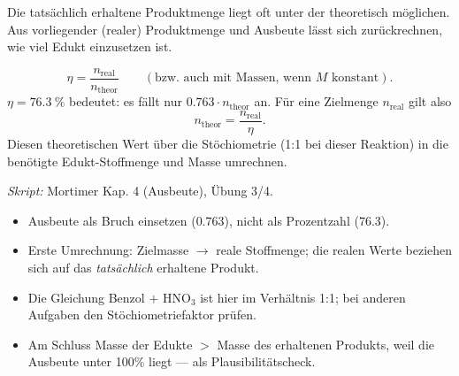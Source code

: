 

Die tatsächlich erhaltene Produktmenge liegt oft unter der theoretisch
möglichen. Aus vorliegender (realer) Produktmenge und Ausbeute lässt sich
zurückrechnen, wie viel Edukt einzusetzen ist.

\begin{werkzeugkasten}[Ausbeute]
\begin{equation}
  \eta = \frac{n_{\text{real}}}{n_{\text{theor}}}
  \qquad(\text{bzw.\ auch mit Massen, wenn } M \text{ konstant}).
\end{equation}
$\eta = \qty{76.3}{\percent}$ bedeutet: es fällt nur
$0.763\cdot n_{\text{theor}}$ an. Für eine Zielmenge
$n_{\text{real}}$ gilt also
\begin{equation}
  n_{\text{theor}} = \frac{n_{\text{real}}}{\eta}.
\end{equation}
Diesen theoretischen Wert über die Stöchiometrie (1:1 bei dieser Reaktion) in
die benötigte Edukt-Stoffmenge und Masse umrechnen.

\textit{Skript:} Mortimer Kap. 4 (Ausbeute), Übung 3/4.
\end{werkzeugkasten}

\begin{achtung}
\begin{itemize}
  \item Ausbeute als Bruch einsetzen ($0.763$), nicht als Prozentzahl
        ($76.3$).
  \item Erste Umrechnung: Zielmasse $\rightarrow$ reale Stoffmenge;
        die realen Werte beziehen sich auf das \emph{tatsächlich} erhaltene
        Produkt.
  \item Die Gleichung Benzol $+$ $\mathrm{HNO_3}$ ist hier im Verhältnis 1:1;
        bei anderen Aufgaben den Stöchiometriefaktor prüfen.
  \item Am Schluss Masse der Edukte $>$ Masse des erhaltenen Produkts, weil
        die Ausbeute unter 100\% liegt --- als Plausibilitätscheck.
\end{itemize}
\end{achtung}
